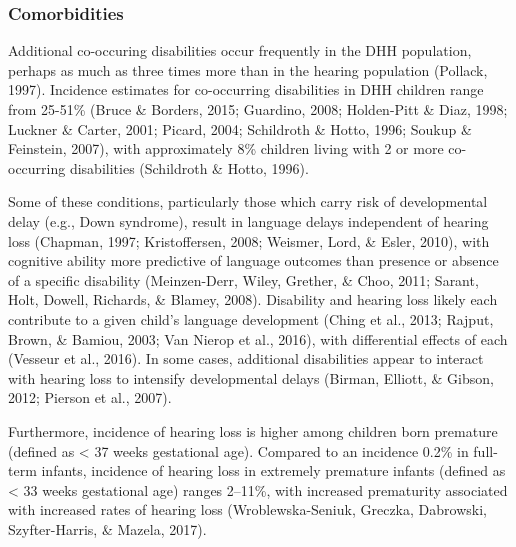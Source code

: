 \documentclass[english,man]{apa6}
\begin{document}
\hypertarget{comorbidities}{%
\subsubsection{Comorbidities}\label{comorbidities}}

Additional co-occuring disabilities occur frequently in the DHH population, perhaps as much as three times more than in the hearing population (Pollack, 1997). Incidence estimates for co-occurring disabilities in DHH children range from 25-51\% (Bruce \& Borders, 2015; Guardino, 2008; Holden-Pitt \& Diaz, 1998; Luckner \& Carter, 2001; Picard, 2004; Schildroth \& Hotto, 1996; Soukup \& Feinstein, 2007), with approximately 8\% children living with 2 or more co-occurring disabilities (Schildroth \& Hotto, 1996).

Some of these conditions, particularly those which carry risk of developmental delay (e.g., Down syndrome), result in language delays independent of hearing loss (Chapman, 1997; Kristoffersen, 2008; Weismer, Lord, \& Esler, 2010), with cognitive ability more predictive of language outcomes than presence or absence of a specific disability (Meinzen-Derr, Wiley, Grether, \& Choo, 2011; Sarant, Holt, Dowell, Richards, \& Blamey, 2008). Disability and hearing loss likely each contribute to a given child's language development (Ching et al., 2013; Rajput, Brown, \& Bamiou, 2003; Van Nierop et al., 2016), with differential effects of each (Vesseur et al., 2016). In some cases, additional disabilities appear to interact with hearing loss to intensify developmental delays (Birman, Elliott, \& Gibson, 2012; Pierson et al., 2007).

Furthermore, incidence of hearing loss is higher among children born premature (defined as \textless{} 37 weeks gestational age). Compared to an incidence 0.2\% in full-term infants, incidence of hearing loss in extremely premature infants (defined as \textless{} 33 weeks gestational age) ranges 2--11\%, with increased prematurity associated with increased rates of hearing loss (Wroblewska-Seniuk, Greczka, Dabrowski, Szyfter-Harris, \& Mazela, 2017).
\end{document}
